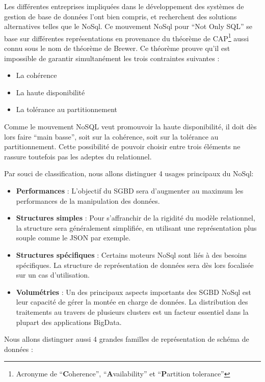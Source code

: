 \documentclass[a4paper,fleqn,12pt,oneside]{report}
\begin{document}
Les différentes entreprises impliquées dans le développement des systèmes de gestion de base de données l'ont bien compris, et recherchent des solutions alternatives telles que le NoSql. \cite{nance2013nosql}Ce mouvement NoSql pour \enquote{Not Only SQL} se base sur différentes représentations en provenance du théorème de CAP\footnote{Acronyme de \enquote{\textbf{C}oherence}, \enquote{\textbf{A}vailability} et \enquote{\textbf{P}artition tolerance}} aussi connu sous le nom de théorème de Brewer. Ce théorème prouve qu’il est impossible de garantir simultanément les trois contraintes suivantes : 
\begin{itemize}
\item La cohérence
\item La haute disponibilité
\item La tolérance au partitionnement
\end{itemize}

Comme le mouvement
NoSQL veut promouvoir la haute disponibilité, il doit dès lors faire \enquote{main basse}, soit sur la
cohérence, soit sur la tolérance au partitionnement. Cette possibilité de pouvoir choisir entre
trois éléments ne rassure toutefois pas les adeptes du relationnel. \cite{di2012adoption}

Par souci de classification, nous allons distinguer 4 usages principaux du NoSql:

\begin{itemize}
\item \textbf{Performances} : L'objectif du SGBD sera d'augmenter au maximum les performances de la manipulation des données. 
\item \textbf{Structures simples} : Pour s’affranchir de la rigidité du modèle relationnel, la structure sera généralement simplifiée, en utilisant une représentation plus souple comme le JSON par exemple.
\item \textbf{Structures spécifiques} : Certains moteurs NoSql sont liés à des besoins spécifiques. La structure de représentation de données sera dès lors focalisée sur un cas d'utilisation.
\item \textbf{Volumétries} : Un des principaux aspects importants des SGBD NoSql est leur capacité de gérer la montée en charge de données. La distribution des traitements au travers de plusieurs clusters est un facteur essentiel dans la plupart des applications BigData.
\end{itemize} 

Nous allons distinguer aussi 4 grandes familles de représentation de schéma de données :
\end{document}
